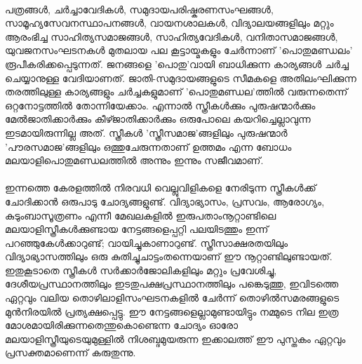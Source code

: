 \paragraph{}	പത്രങ്ങൾ, ചർച്ചാവേദികൾ, സമുദായപരിഷ്കരണസംഘങ്ങൾ, സാമൂഹ്യസേവനസ്ഥാപനങ്ങൾ, വായനശാലകൾ, വിദ്യാലയങ്ങളിലും മറ്റും ആരംഭിച്ച സാഹിത്യസമാജങ്ങൾ, സാഹിത്യവേദികൾ, വനിതാസമാജങ്ങൾ, യുവജനസംഘടനകൾ മുതലായ പല കൂട്ടായ്മകളും ചേർന്നാണ് 'പൊതുമണ്ഡലം' രൂപീകരിക്കപ്പെടുന്നത്. ജനങ്ങളെ 'പൊതു'വായി ബാധിക്കുന്ന കാര്യങ്ങൾ ചർച്ച ചെയ്യാനുള്ള വേദിയാണത്. ജാതി-സമുദായങ്ങളുടെ സീമകളെ അതിലംഘിക്കുന്ന തരത്തിലുള്ള കാര്യങ്ങളും ചർച്ചകളുമാണ് 'പൊതുമണ്ഡല'ത്തിൽ വരുന്നതെന്ന് ഒറ്റനോട്ടത്തിൽ തോന്നിയേക്കാം. എന്നാൽ സ്ത്രീകൾക്കും പുരുഷന്മാർക്കും മേൽജാതിക്കാർക്കും കീഴ്ജാതിക്കാർക്കും ഒരുപോലെ കയറിച്ചെല്ലാവുന്ന ഇടമായിരുന്നില്ല അത്. സ്ത്രീകൾ 'സ്ത്രീസമാജ'ങ്ങളിലും പുരുഷന്മാർ 'പൗരസമാജ'ങ്ങളിലും ഒത്തുചേരുന്നതാണ് ഉത്തമം എന്ന ബോധം മലയാളിപൊതുമണ്ഡലത്തിൽ അന്നും ഇന്നും സജീവമാണ്.

\paragraph{}	ഇന്നത്തെ കേരളത്തിൽ നിരവധി വെല്ലുവിളികളെ നേരിടുന്ന സ്ത്രീകൾക്ക് ചോദിക്കാൻ ഒരുപാടു ചോദ്യങ്ങളുണ്ട്. വിദ്യാഭ്യാസം, പ്രസവം, ആരോഗ്യം, കുടുംബാസൂത്രണം എന്നീ മേഖലകളിൽ ഇരുപതാംനൂറ്റാണ്ടിലെ മലയാളിസ്ത്രീകൾക്കുണ്ടായ നേട്ടങ്ങളെപ്പറ്റി പലയിടത്തും ഇന്ന് പറഞ്ഞുകേൾക്കാറുണ്ട്; വായിച്ചുകാണാറുണ്ട്. സ്ത്രീസാക്ഷരതയിലും വിദ്യാഭ്യാസത്തിലും ഒരു കുതിച്ചുചാട്ടംതന്നെയാണ് ഈ നൂറ്റാണ്ടിലുണ്ടായത്. ഇതുകൂടാതെ സ്ത്രീകൾ സർക്കാർജോലികളിലും മറ്റും പ്രവേശിച്ചു, ദേശീയപ്രസ്ഥാനത്തിലും ഇടതുപക്ഷപ്രസ്ഥാനത്തിലും പങ്കെടുത്തു, ഇവിടത്തെ ഏറ്റവും വലിയ തൊഴിലാളിസംഘടനകളിൽ ചേർന്ന് തൊഴിൽസമരങ്ങളുടെ മുൻനിരയിൽ പ്രത്യക്ഷപ്പെട്ടു. ഈ നേട്ടങ്ങളെല്ലാമുണ്ടായിട്ടും നമ്മുടെ നില ഇത്ര മോശമായിരിക്കുന്നതെന്തുകൊണ്ടെന്ന ചോദ്യം ഓരോ മലയാളിസ്ത്രീയുടെയുമുള്ളിൽ നിശബ്ദമുയരുന്ന ഇക്കാലത്ത് ഈ പുസ്തകം ഏറ്റവും പ്രസക്തമാണെന്ന് കരുതുന്നു.

